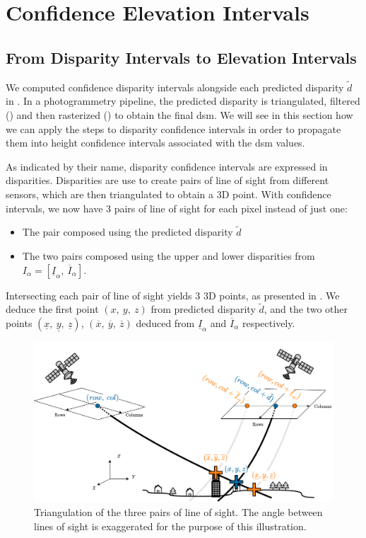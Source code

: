 \chapter{Confidence Elevation Intervals}\label{chap:elevation_intervals}
\section{From Disparity Intervals to Elevation Intervals}\label{sec:elevation_intervals}
We computed confidence disparity intervals alongside each predicted disparity $\tilde{d}$ in . In a photogrammetry pipeline, the predicted disparity is triangulated, filtered () and then rasterized () to obtain the final \acrshort{dsm}. We will see in this section how we can apply the steps to disparity confidence intervals in order to propagate them into height confidence intervals associated with the \acrshort{dsm} values.

As indicated by their name, disparity confidence intervals are expressed in disparities. Disparities are use to create pairs of line of sight from different sensors, which are then triangulated to obtain a 3D point. With confidence intervals, we now have 3 pairs of line of sight for each pixel instead of just one:
\begin{itemize}
    \item The pair composed using the predicted disparity $\tilde{d}$
    \item The two pairs composed using the upper and lower disparities from $I_\alpha=[\underline{I}_\alpha, ~\overline{I}_\alpha]$.
\end{itemize}
Intersecting each pair of line of sight yields $3$ 3D points, as presented in . We deduce the first point $(x, ~y, ~z)$ from predicted disparity $\tilde{d}$, and the two other points $(\underline{x}, ~\underline{y}, ~\underline{z})$, $(\overline{x}, ~\overline{y}, ~\overline{z})$ deduced from $\underline{I}_\alpha$ and $\overline{I}_\alpha$ respectively.
\begin{figure}
    \centering
    \includegraphics[width=\linewidth]{Images/Chap_6/Pairs_of_line_of_sight.png}
    \caption{Triangulation of the three pairs of line of sight. The angle between lines of sight is exaggerated for the purpose of this illustration.}
    \label{fig:pairs_of_line_of_sight}
\end{figure}

